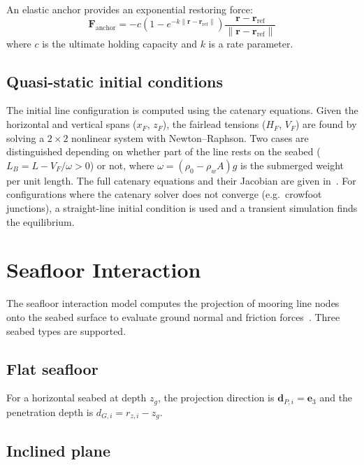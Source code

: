 \documentclass[11pt]{article}
\begin{document}
An elastic anchor provides an exponential restoring force:
\begin{equation}
\mathbf{F}_{\text{anchor}} = -c\left(1 - e^{-k\|\mathbf{r}-\mathbf{r}_{\text{ref}}\|}\right)\frac{\mathbf{r}-\mathbf{r}_{\text{ref}}}{\|\mathbf{r}-\mathbf{r}_{\text{ref}}\|}
\end{equation}
where $c$ is the ultimate holding capacity and $k$ is a rate parameter.

\subsection{Quasi-static initial conditions}

The initial line configuration is computed using the catenary equations. Given the horizontal and vertical spans ($x_F$, $z_F$), the fairlead tensions ($H_F$, $V_F$) are found by solving a $2\times 2$ nonlinear system with Newton--Raphson. Two cases are distinguished depending on whether part of the line rests on the seabed ($L_B = L - V_F/\omega > 0$) or not, where $\omega = (\rho_0 - \rho_w A)g$ is the submerged weight per unit length. The full catenary equations and their Jacobian are given in~\cite{faltinsen}. For configurations where the catenary solver does not converge (e.g.\ crowfoot junctions), a straight-line initial condition is used and a transient simulation finds the equilibrium.


\section{Seafloor Interaction}
\label{sec:seafloor}

The seafloor interaction model computes the projection of mooring line nodes onto the seabed surface to evaluate ground normal and friction forces~\cite{Desire-2022}. Three seabed types are supported.

\subsection{Flat seafloor}

For a horizontal seabed at depth $z_g$, the projection direction is $\mathbf{d}_{P,i} = \mathbf{e}_3$ and the penetration depth is $d_{G,i} = r_{z,i} - z_g$.

\subsection{Inclined plane}
\end{document}
